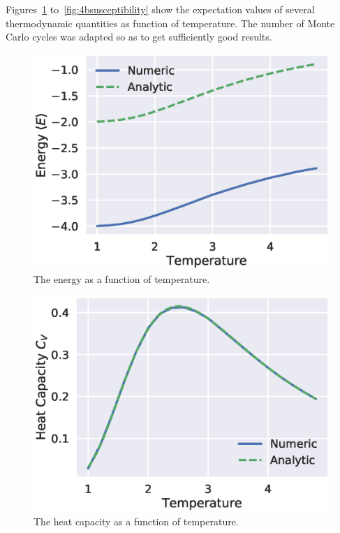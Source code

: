 \documentclass[aps,reprint]{revtex4-1}
\begin{document}
Figures~\ref{fig:4be} to~\ref{fig:4bsusceptibility} show the expectation
values of several
thermodynamic quantities as function of temperature. The number of Monte Carlo
cycles was adapted so as to get sufficiently good results. 
\begin{figure}[H]
  \centering
  \includegraphics[width=\columnwidth]{figures/4bEnergy.eps}
  \caption{The energy as a function of temperature.}
  \label{fig:4be}
\end{figure}
\begin{figure}[H]
  \centering
  \includegraphics[width=\columnwidth]{figures/4bHeatCapacity.eps}
  \caption{The heat capacity as a function of temperature.}
  \label{fig:4bcv}
\end{figure}
\end{document}
